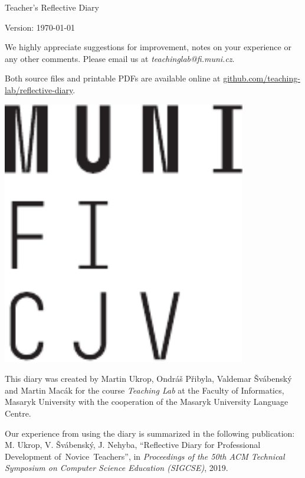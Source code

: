 \documentclass[twoside,openany]{book}
\begin{document}







\newpage
\vspace*{\fill}
Teacher's Reflective Diary

Version: \today

\bigskip
We highly appreciate suggestions for improvement, notes on your experience or any other comments. Please email us at \textit{teachinglab@fi.muni.cz}.

Both source files and printable PDFs are available online at \url{github.com/teaching-lab/reflective-diary}.

\medskip
\begin{minipage}{0.28\textwidth}
	\includegraphics[width=0.80\textwidth]{../img/muni}\hfill
	\end{minipage}
\begin{minipage}{0.72\textwidth}
This diary was created by Martin Ukrop, Ondráš Přibyla, Valdemar Švábenský and Martin Macák for the course \textit{Teaching Lab} at the Faculty of Informatics, Masaryk University with the cooperation of the Masaryk University Language Centre.
\end{minipage}

\medskip
Our experience from using the diary is summarized in the following publication: M. Ukrop, V. Švábenský, J. Nehyba, \enquote{Reflective Diary for Professional Development of~Novice~Teachers}, in \textit{Proceedings of the 50th ACM Technical Symposium on Computer Science Education (SIGCSE)}, 2019.
\end{document}
